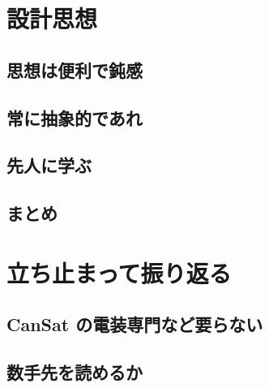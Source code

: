 \documentclass[dvipdfmx]{jsarticle}
\begin{document}
\clearpage

\section{設計思想}

\subsection{思想は便利で鈍感}

\subsection{常に抽象的であれ}

\subsection{先人に学ぶ}

\subsection{まとめ}


\clearpage

\section{立ち止まって振り返る}

\subsection{CanSat の電装専門など要らない}

\subsection{数手先を読めるか}
\end{document}
